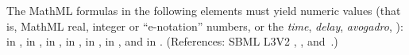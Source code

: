 The MathML formulas in the following elements must yield numeric
values (that is, MathML real, integer or ``e-notation'' numbers,
or the \emph{time}, \emph{delay}, \emph{avogadro},  ):
 in \KineticLaw,  in
\InitialAssignment,  in \AssignmentRule,  in
\RateRule,  in \AlgebraicRule,  in \Event
\Delay, and  in \EventAssignment.  (References: SBML L3V2 
, , 
 and~.)


